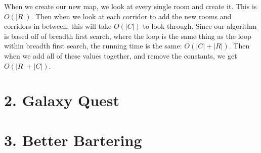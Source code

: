 \documentclass[11pt]{article}
\newenvironment{qparts}{\begin{enumerate}[{(}a{)}]}{\end{enumerate}}
\begin{document}
\begin{qparts}
When we create our new map, we look at every single room and create it. This is $O(|R|)$. Then when we look at each corridor to add the new rooms and corridors in between, this will take $O(|C|)$ to look through. Since our algorithm is based off of breadth first search, where the loop is the same thing as the loop within breadth first search, the running time is the same: $O(|C| + |R|)$. Then when we add all of these values together, and remove the constants, we get $O(|R| + |C|)$.
\end{qparts}
\newpage
\section*{2. Galaxy Quest}

\newpage
\section*{3. Better Bartering}
\end{document}
